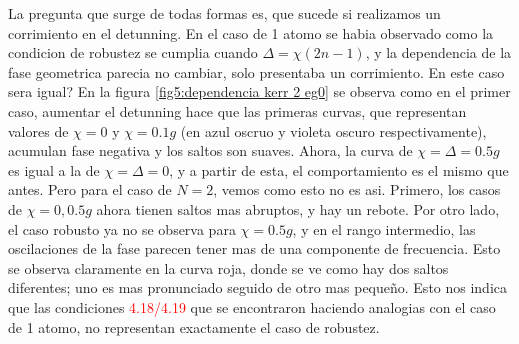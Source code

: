 La pregunta que surge de todas formas es, que sucede si realizamos un corrimiento en el detunning. En el caso de 1 atomo se habia observado como la condicion de robustez se cumplia cuando $\Delta=\chi(2n-1)$, y la dependencia de la fase geometrica parecia no cambiar, solo presentaba un corrimiento. En este caso sera igual?
En la figura \ref{fig5:dependencia kerr 2 eg0} se observa como en el primer caso, aumentar el detunning hace que las primeras curvas, que representan valores de $\chi=0$ y $\chi=0.1g$ (en azul oscruo y violeta oscuro respectivamente), acumulan fase negativa y los saltos son suaves. Ahora, la curva de $\chi=\Delta=0.5g$ es igual a la de $\chi=\Delta=0$, y a partir de esta, el comportamiento es el mismo que antes. Pero para el caso de $N=2$, vemos como esto no es asi. Primero, los casos de $\chi=0,0.5g$ ahora tienen saltos mas abruptos, y hay un rebote. Por otro lado, el caso robusto ya no se observa para $\chi=0.5g$, y en el rango intermedio, las oscilaciones de la fase parecen tener mas de una componente de frecuencia. Esto se observa claramente en la curva roja, donde se ve como hay dos saltos diferentes; uno es mas pronunciado seguido de otro mas pequeño. Esto nos indica que las condiciones \textcolor{red}{4.18/4.19} que se encontraron haciendo analogias con el caso de 1 atomo, no representan exactamente el caso de robustez.

